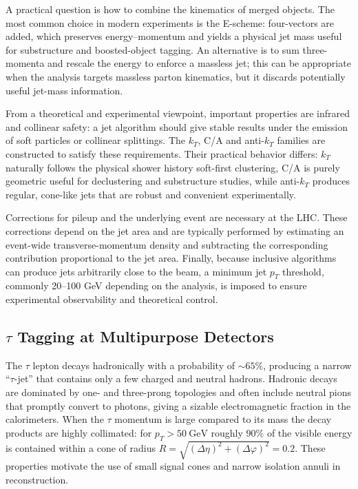 A practical question is how to combine the kinematics of merged objects. The most common choice in modern experiments is the E-scheme: four-vectors are added, which preserves energy–momentum and yields a physical jet mass useful for substructure and boosted-object tagging. An alternative is to sum three-momenta and rescale the energy to enforce a massless jet; this can be appropriate when the analysis targets massless parton kinematics, but it discards potentially useful jet-mass information.

From a theoretical and experimental viewpoint, important properties are infrared and collinear safety: a jet algorithm should give stable results under the emission of soft particles or collinear splittings. The $k_T$, C/A and anti-$k_T$ families are constructed to satisfy these requirements. Their practical behavior differs: $k_T$ naturally follows the physical shower history soft-first clustering, C/A is purely geometric useful for declustering and substructure studies, while anti-$k_T$ produces regular, cone-like jets that are robust and convenient experimentally.

Corrections for pileup and the underlying event are necessary at the LHC. These corrections depend on the jet area and are typically performed by estimating an event-wide transverse-momentum density and subtracting the corresponding contribution proportional to the jet area. Finally, because inclusive algorithms can produce jets arbitrarily close to the beam, a minimum jet $p_T$ threshold, commonly 20–100 GeV depending on the analysis, is imposed to ensure experimental observability and theoretical control.

\subsection{$\tau$ Tagging at Multipurpose Detectors}

The $\tau$ lepton decays hadronically with a probability of $\sim65\%$, producing a narrow ``$\tau$-jet'' that contains only a few charged and neutral hadrons. Hadronic decays are dominated by one- and three-prong topologies and often include neutral pions that promptly convert to photons, giving a sizable electromagnetic fraction in the calorimeters. When the $\tau$ momentum is large compared to its mass the decay products are highly collimated: for $p_T>50\ \mathrm{GeV}$ roughly $90\%$ of the visible energy is contained within a cone of radius $R=\sqrt{(\Delta\eta)^2+(\Delta\varphi)^2}=0.2$. These properties motivate the use of small signal cones and narrow isolation annuli in reconstruction.

